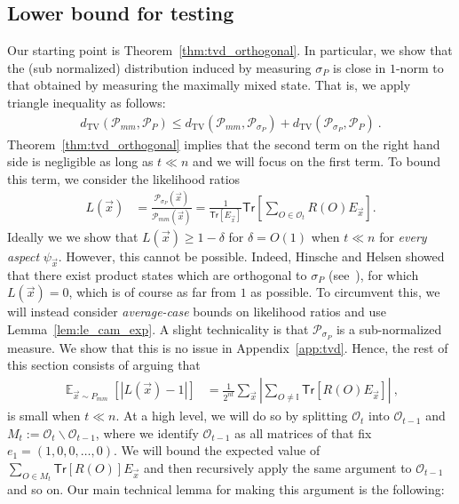 \documentclass[11pt]{article}
\newcommand{\E}{\mathop{\mathbb{E}}}
\newcommand{\id}{\ensuremath{\mathbb{I}}}
\newcommand{\Tr}{\mathsf{Tr}}
\newcommand{\TV}{d_{\text{TV}}}
\newcommand{\Oc}{\mathcal{O}}
\begin{document}
\subsection{Lower bound for testing}\label{sec:lb_testing}
Our starting point is Theorem~\ref{thm:tvd_orthogonal}. In particular, we show that the (sub normalized) distribution induced by measuring $\sigma_P$ is close in $1$-norm to that obtained by measuring the maximally mixed state. That is, we apply triangle inequality as follows:
\begin{align}
    \TV(\mathcal{P}_{mm},\mathcal{P}_P) \leq \TV(\mathcal{P}_{mm}, \mathcal{P}_{\sigma_P}) + \TV(\mathcal{P}_{\sigma_P},\mathcal{P}_P)\ .
\end{align}
Theorem~\ref{thm:tvd_orthogonal} implies that the second term on the right hand side is negligible as long as $t \ll n$ and we will focus on the first term. To bound this term, we consider the likelihood ratios
\begin{align}
    L(\vec{x}) & = \frac{\mathcal{P}_{\sigma_P}(\vec{x})}{\mathcal{P}_{mm}(\vec{x})}  = \frac{1}{\Tr[E_{\vec{x}}]} \Tr\left[\sum_{O \in \Oc_t}R(O) E_{\vec{x}} \right].
\end{align}
Ideally we we show that $L(\vec{x}) \geq 1-\delta$ for $\delta = O(1)$ when $t \ll n$ for \emph{every  aspect} $\psi_{\vec{x}}$. However, this cannot be possible. Indeed, Hinsche and Helsen showed that there exist product states which are orthogonal to $\sigma_P$ (see~\cite[Lemma 4.14]{hinsche2025single}), for which $L(\vec{x}) = 0$, which is of course as far from $1$ as possible. To circumvent this, we will instead consider \emph{average-case} bounds on likelihood ratios and use Lemma~\ref{lem:le_cam_exp}. A slight technicality is that $\mathcal{P}_{\sigma_P}$ is a sub-normalized measure. We show that this is no issue in Appendix~\ref{app:tvd}. Hence, the rest of this section consists of arguing that
\begin{align}
    \E_{\vec{x}\sim P_{mm}}[ \left\vert L(\vec{x}) - 1\right\vert ] & = \frac{1}{2^{nt}}\sum_{\vec{x}} \left\vert\sum_{O \neq \id} \Tr[R(O)E_{\vec{x}}] \right\vert\ ,
\end{align}
is small when $t \ll n$. At a high level, we will do so by splitting $\Oc_t$ into $\Oc_{t-1}$ and $M_t := \Oc_t \backslash \Oc_{t-1}$, where we identify $\Oc_{t-1}$ as all matrices of that fix $e_1 = (1,0,0,\ldots,0)$. We will bound the expected value of $\sum_{O\in M_t}\Tr[R(O)]E_{\vec{x}}$ and then recursively apply the same argument to $\Oc_{t-1}$ and so on. Our main technical lemma for making this argument is the following:
\end{document}
